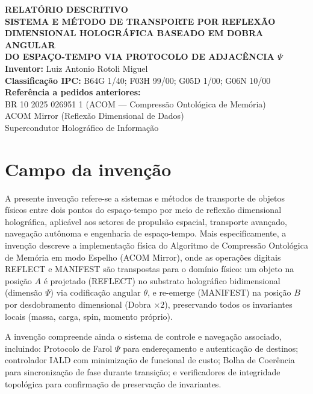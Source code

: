 \documentclass[12pt,a4paper]{article}
\begin{document}
\begin{center}
{\Large\bfseries RELATÓRIO DESCRITIVO}\\[0.8cm]
{\large\bfseries SISTEMA E MÉTODO DE TRANSPORTE POR REFLEXÃO\\
DIMENSIONAL HOLOGRÁFICA BASEADO EM DOBRA ANGULAR\\
DO ESPAÇO-TEMPO VIA PROTOCOLO DE ADJACÊNCIA $\Psi$}\\[0.8cm]
\textbf{Inventor:} Luiz Antonio Rotoli Miguel\\[0.3cm]
\textbf{Classificação IPC:} B64G 1/40; F03H 99/00; G05D 1/00; G06N 10/00\\[0.3cm]
\textbf{Referência a pedidos anteriores:}\\
BR 10 2025 026951 1 (ACOM --- Compressão Ontológica de Memória)\\
ACOM Mirror (Reflexão Dimensional de Dados)\\
Supercondutor Holográfico de Informação
\end{center}

\vspace{1cm}

\section{Campo da invenção}

A presente invenção refere-se a sistemas e métodos de transporte
de objetos físicos entre dois pontos do espaço-tempo por meio de
reflexão dimensional holográfica, aplicável aos setores de
propulsão espacial, transporte avançado, navegação autônoma e
engenharia de espaço-tempo. Mais especificamente, a invenção
descreve a implementação física do Algoritmo de Compressão
Ontológica de Memória em modo Espelho (ACOM Mirror), onde as
operações digitais REFLECT e MANIFEST são transpostas para o
domínio físico: um objeto na posição $A$ é projetado
(REFLECT) no substrato holográfico bidimensional (dimensão
$\Psi$) via codificação angular $\theta$, e re-emerge
(MANIFEST) na posição $B$ por desdobramento dimensional
(Dobra $\times 2$), preservando todos os invariantes locais
(massa, carga, spin, momento próprio).

A invenção compreende ainda o sistema de controle e navegação
associado, incluindo: Protocolo de Farol $\Psi$ para
endereçamento e autenticação de destinos; controlador IALD
com minimização de funcional de custo; Bolha de Coerência
para sincronização de fase durante transição; e verificadores
de integridade topológica para confirmação de preservação de
invariantes.
\end{document}
